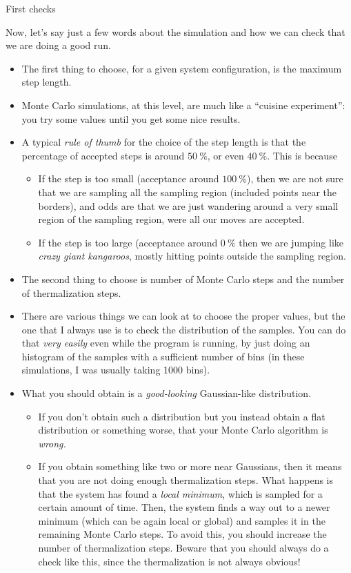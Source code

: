 \documentclass[10pt, compress, protectframetitle, handout]{beamer}
\begin{document}
\begin{frame}[allowframebreaks]{First checks}
	
	Now, let's say just a few words about the simulation and how we can check that we are doing a good run.
	
	\begin{itemize}
		\item The \alert{first thing} to choose, for a given system configuration, is the maximum \alert{step length}.
		\item Monte Carlo simulations, at this level, are much like a ``cuisine experiment'': you try some values until you get some nice results.
		\item A typical \emph{rule of thumb} for the choice of the step length is that the percentage of accepted steps is \alert{around $\SI{50}{\percent}$}, or even $\SI{40}{\percent}$. This is because
		\begin{itemize}
			\item If the step is too small (acceptance around $\SI{100}{\percent}$), then we are not sure that we are sampling all the sampling region (included points near the borders), and odds are that we are just wandering around a very small region of the sampling region, were all our moves are accepted.
			\item If the step is too large (acceptance around $\SI{0}{\percent}$ then we are jumping like \emph{crazy giant kangaroos}, mostly hitting points outside the sampling region.
		\end{itemize}
		\item The \alert{second thing} to choose is number of Monte Carlo steps and the number of \alert{thermalization steps}.
		\item There are various things we can look at to choose the proper values, but the one that I always use is to check the \alert{distribution of the samples}. You can do that \emph{very easily} even while the program is running, by just doing an \alert{histogram} of the samples with a sufficient number of bins (in these simulations, I was usually taking 1000 bins).
		\item What you should obtain is a \emph{good-looking} Gaussian-like distribution.
		\begin{itemize}
			\item If you don't obtain such a distribution but you instead obtain a flat distribution or something worse, that your Monte Carlo algorithm is \emph{wrong.}
			\item If you obtain something like two or more near Gaussians, then it means that you are \alert{not doing enough thermalization} steps. What happens is that the system has found a \emph{local minimum}, which is sampled for a certain amount of time. Then, the system finds a way out to a newer minimum (which can be again local or global) and samples it in the remaining Monte Carlo steps. To avoid this, you should increase the number of thermalization steps. Beware that you should always do a check like this, since the thermalization is not always obvious!

\end{itemize}
\end{itemize}
\end{frame}
\end{document}
